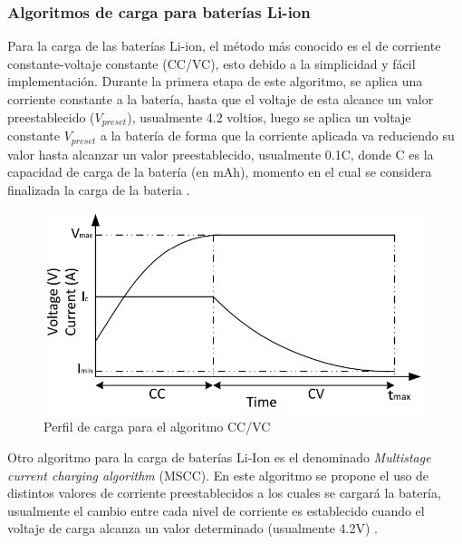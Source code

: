 \subsubsection*{Algoritmos de carga para baterías Li-ion}

Para la carga de las baterías Li-ion, el método más conocido es el de corriente constante-voltaje constante (CC/VC), esto 
debido a la simplicidad y fácil implementación. Durante la primera etapa de este algoritmo, se aplica una corriente constante
a la batería, hasta que el voltaje de esta alcance un valor preestablecido ($V_{preset}$), usualmente 4.2 voltios, luego se aplica 
un voltaje constante $V_{preset}$ a la batería de forma que la corriente aplicada va reduciendo su valor hasta alcanzar un valor
preestablecido, usualmente 0.1C, donde C es la capacidad de carga de la batería (en mAh), momento en el cual se considera finalizada la 
carga de la bateria \cite{shen_charging_2012}.

\begin{figure}[H]
   \centering
   \includegraphics[scale=.6]{imagenes/perfil de carga CC-CV.png }
   \caption{Perfil de carga para el algoritmo CC/VC \cite{shen_charging_2012} }
   \label{fig:cccv}
\end{figure}


Otro algoritmo para la carga de baterías Li-Ion es el denominado \textit{Multistage current charging algorithm} (MSCC). En este
algoritmo se propone el uso de distintos valores de corriente preestablecidos  a los cuales se cargará la batería,
usualmente el cambio entre cada nivel de corriente es establecido cuando el voltaje de carga alcanza un valor determinado
(usualmente 4.2V) \cite{shen_charging_2012}. 


